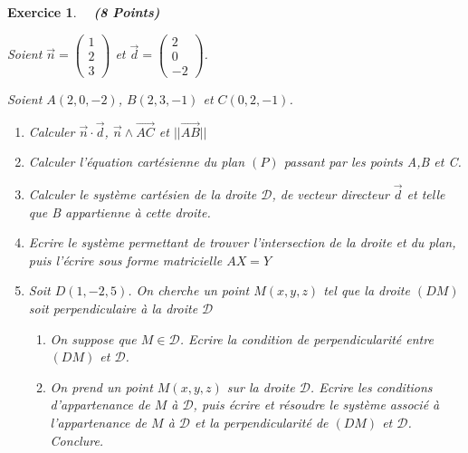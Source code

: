 \documentclass[12pt,fleqn]{report}
\newcommand{\hr}{\hrulefill}
\newtheorem{EX}{Exercice}
\newenvironment{exau}{\begin{EX} \normalfont}{\end{EX}}
\begin{document}
\begin{exau}
	\ \hr \ \textbf{(8 Points)}
	
Soient $\vec{n} =\begin{pmatrix} 1 \\ 2 \\3 \end{pmatrix}$ et $\vec{d} =\begin{pmatrix} 2 \\ 0 \\-2 \end{pmatrix}$.

Soient $A(2,0,-2)$, $B(2,3,-1)$ et  $C(0,2,-1)$. 
\begin{enumerate}
\item[${\rm a)}$] Calculer $\vec{n} \cdot \vec{d}$, $\vec{n} \wedge \vec{AC}$ et $||\vec{AB}||$
\item[${\rm b)}$] Calculer l'équation cartésienne du plan $(P)$ passant par les points A,B et C.
\item[${\rm c)}$] Calculer le système cartésien de la droite $\mathcal{D}$, de vecteur directeur $\vec{d}$ et telle que B appartienne à cette droite.
\item[${\rm d)}$] Ecrire le système permettant de trouver l'intersection de la droite et du plan, puis l'écrire sous forme matricielle $AX = Y$
\item[${\rm e)}$]
Soit $D(1,-2,5)$. On cherche un point $M(x,y,z)$ tel que la droite $(DM)$ soit perpendiculaire à la droite $\mathcal{D}$
\begin{enumerate}
\item[${\rm (i)}$] On suppose que $M \in \mathcal{D}$. Ecrire la condition de perpendicularité entre $(DM)$ et $\mathcal{D}$.
\item[${\rm (ii)}$] On prend un point $M(x,y,z)$ sur la droite $\mathcal{D}$. Ecrire les conditions d'appartenance de $M$ à $\mathcal{D}$, puis écrire et résoudre le système associé à l'appartenance de $M$ à $\mathcal{D}$ et la perpendicularité de $(DM)$ et $\mathcal{D}$. Conclure.
\end{enumerate}
\end{enumerate}
\end{exau}


\end{document}
